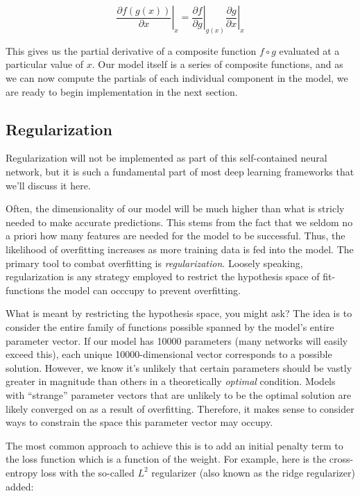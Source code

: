 \[\left.\frac{\partial f(g(x))}{\partial x}\right\rvert_x = \left.\frac{\partial f}{\partial g}\right\rvert_{g(x)} \left.\frac{\partial g}{\partial x}\right\rvert_x\]

This gives us the partial derivative of a composite function
\(f\circ g\) evaluated at a particular value of \(x\). Our model itself
is a series of composite functions, and as we can now compute the
partials of each individual component in the model, we are ready to
begin implementation in the next section.

\subsection{Regularization}\label{regularization}

Regularization will not be implemented as part of this self-contained
neural network, but it is such a fundamental part of most deep learning
frameworks that we'll discuss it here.

Often, the dimensionality of our model will be much higher than what is
stricly needed to make accurate predictions. This stems from the fact
that we seldom no a priori how many features are needed for the model to
be successful. Thus, the likelihood of overfitting increases as more
training data is fed into the model. The primary tool to combat
overfitting is \emph{regularization}. Loosely speaking, regularization
is any strategy employed to restrict the hypothesis space of
fit-functions the model can occcupy to prevent overfitting.

What is meant by restricting the hypothesis space, you might ask? The
idea is to consider the entire family of functions possible spanned by
the model's entire parameter vector. If our model has 10000 parameters
(many networks will easily exceed this), each unique 10000-dimensional
vector corresponds to a possible solution. However, we know it's
unlikely that certain parameters should be vastly greater in magnitude
than others in a theoretically \emph{optimal} condition. Models with
``strange'' parameter vectors that are unlikely to be the optimal
solution are likely converged on as a result of overfitting. Therefore,
it makes sense to consider ways to constrain the space this parameter
vector may occupy.

The most common approach to achieve this is to add an initial penalty
term to the loss function which is a function of the weight. For
example, here is the cross-entropy loss with the so-called \(L^2\)
regularizer (also known as the ridge regularizer) added:

